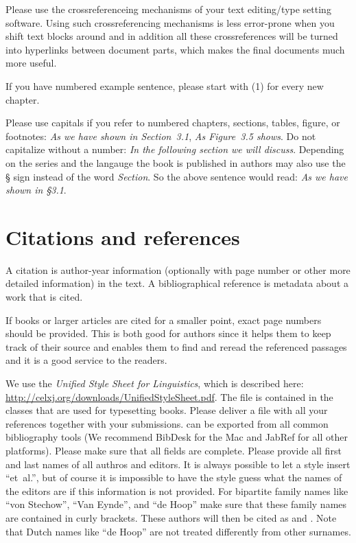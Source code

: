 Please use the crossreferenceing mechanisms of your text editing/type setting software. Using such
crossreferencing mechanisms is less error-prone when you shift text blocks around and in addition
all these crossreferences will be turned into hyperlinks between document parts, which makes the
final documents much more useful.

If you have numbered example sentence, please start with (1) for every new chapter.

Please use capitals if you refer to numbered chapters, sections, tables, figure, or footnotes: \emph{As we have shown in
  Section~3.1}, \emph{As Figure~3.5 shows}. Do not capitalize without a number: \emph{In the
  following section we will discuss}.
Depending on the series and the langauge the book is published in authors may also use the § sign
instead of the word \emph{Section}. So the above sentence would read: \emph{As we have shown in
  §3.1}.

\section{Citations and references}
\label{sec-references-authors}

A citation is author-year information (optionally with page number or other more detailed information) in the text. A bibliographical reference is metadata about a work that is cited.

If books or larger articles are cited for a smaller point, exact page numbers should be provided. This is both good for
authors since it helps them to keep track of their source and enables them to find and reread the
referenced passages and it is a good service to the readers.

We use the \emph{Unified Style Sheet for Linguistics}, which is described here:
\url{http://celxj.org/downloads/UnifiedStyleSheet.pdf}. The \bibtex file is contained in the \latex
classes that are used for typesetting \lsp books. Please deliver a \bibtex file with all your
references together with your submissions. \bibtex can be exported from all common bibliography
tools (We recommend BibDesk for the Mac and JabRef for all other platforms). Please make sure that
all \bibtex fields are complete. Please provide all first and last names of all authros and
editors. It is always possible to let a \bibtex style insert ``et~al.'', but of course it is
impossible to have the \bibtex style guess what the names of the editors are if this information is
not provided. For bipartite family names like ``von Stechow'', ``Van Eynde'', and ``de Hoop'' make sure that these
family names are contained in curly brackets. These authors will then be cited as
\citet{VanEynde2006a} and \citet{vonStechow84a}. Note that Dutch names like ``de Hoop'' are not treated differently from other surnames.

